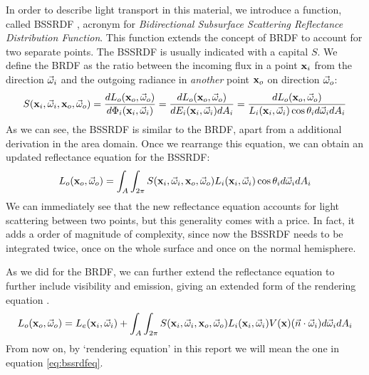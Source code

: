 In order to describe light transport in this material, we introduce a function, called BSSRDF \citep{Nicodemus:1992:GCN:136913.136929}, acronym for \emph{Bidirectional Subsurface Scattering Reflectance Distribution Function}. This function extends the concept of BRDF to account for two separate points. The BSSRDF is usually indicated with a capital $S$. We define the BRDF as the ratio between the incoming flux in a point $\mathbf{x}_i$ from the direction $\vec{\omega}_i$ and the outgoing radiance in \emph{another} point $\mathbf{x}_o$ on direction $\vec{\omega}_o$:
$$
S(\mathbf{x}_i, \vec{\omega}_i, \mathbf{x}_o, \vec{\omega}_o) = \frac{d L_o(\mathbf{x}_o,\vec{\omega}_o)}{d \Phi_i(\mathbf{x}_i,\vec{\omega}_i)} = \frac{d L_o(\mathbf{x}_o,\vec{\omega}_o)}{d E_i(\mathbf{x}_i,\vec{\omega}_i) d A_i} = \frac{d L_o(\mathbf{x}_o,\vec{\omega}_o)}{L_i(\mathbf{x}_i,\vec{\omega}_i) \cos \theta_i d\vec{\omega}_i d A_i}  
$$
As we can see, the BSSRDF is similar to the BRDF, apart from a additional derivation in the area domain. Once we rearrange this equation, we can obtain an updated reflectance equation for the BSSRDF:
$$
L_o(\mathbf{x}_o,\vec{\omega}_o) = \int_A \int_{2\pi} S(\mathbf{x}_i, \vec{\omega}_i, \mathbf{x}_o, \vec{\omega}_o) L_i(\mathbf{x}_i,\vec{\omega}_i) \cos \theta_i d\vec{\omega}_i d A_i
$$
We can immediately see that the new reflectance equation accounts for light scattering between two points, but this generality comes with a price. In fact, it adds a order of magnitude of complexity, since now the BSSRDF needs to be integrated twice, once on the whole surface and once on the normal hemisphere.

As we did for the BRDF, we can further extend the reflectance equation to further include visibility and emission, giving an extended form of the rendering equation \citep{Jensen:2001:PMS:383259.383319}. 
\begin{equation}
L_o(\mathbf{x}_o,\vec{\omega}_o) = L_e(\mathbf{x}_i,\vec{\omega}_i) + \int_A \int_{2\pi} S(\mathbf{x}_i, \vec{\omega}_i, \mathbf{x}_o, \vec{\omega}_o) L_i(\mathbf{x}_i,\vec{\omega}_i) V(\mathbf{x}) (\vec{n} \cdot \vec{\omega}_i) d\vec{\omega}_i d A_i
\label{eq:bssrdfeq}
\end{equation}
From now on, by `rendering equation' in this report we will mean the one in equation \ref{eq:bssrdfeq}. 

